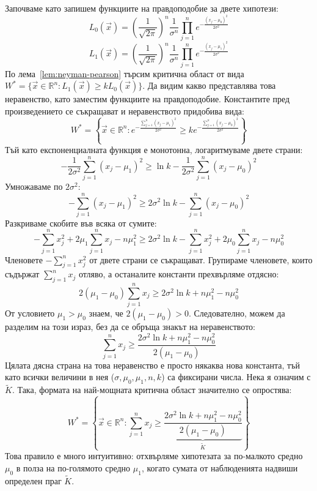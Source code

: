 \begin{example}
Започваме като запишем функциите на правдоподобие за двете хипотези:
\[
L_0(\vec{x}) = \left(\frac{1}{\sqrt{2\pi}}\right)^n \frac{1}{\sigma^n} \prod_{j=1}^n e^{-\frac{(x_j - \mu_0)^2}{2\sigma^2}}
\]
\[
L_1(\vec{x}) = \left(\frac{1}{\sqrt{2\pi}}\right)^n \frac{1}{\sigma^n} \prod_{j=1}^n e^{-\frac{(x_j - \mu_1)^2}{2\sigma^2}}
\]
По лема~\ref{lem:neyman-pearson} търсим критична област от вида $W^* = \{ \vec{x} \in \mathbb{R}^n : L_1(\vec{x}) \ge k L_0(\vec{x}) \}$. Да видим какво представлява това неравенство, като заместим функциите на правдоподобие. Константите пред произведението се съкращават и неравенството придобива вида:
\[
W^* = \left\{ \vec{x} \in \mathbb{R}^n : e^{-\frac{\sum_{j=1}^n (x_j - \mu_1)^2}{2\sigma^2}} \ge k e^{-\frac{\sum_{j=1}^n (x_j - \mu_0)^2}{2\sigma^2}} \right\}
\]
Тъй като експоненциалната функция е монотонна, логаритмуваме двете страни:
\[
-\frac{1}{2\sigma^2} \sum_{j=1}^n (x_j - \mu_1)^2 \ge \ln k - \frac{1}{2\sigma^2} \sum_{j=1}^n (x_j - \mu_0)^2
\]
Умножаваме по $2\sigma^2$:
\[
- \sum_{j=1}^n (x_j - \mu_1)^2 \ge 2\sigma^2 \ln k - \sum_{j=1}^n (x_j - \mu_0)^2
\]
Разкриваме скобите във всяка от сумите:
\[
- \sum_{j=1}^n x_j^2 + 2\mu_1 \sum_{j=1}^n x_j - n\mu_1^2 \ge 2\sigma^2 \ln k - \sum_{j=1}^n x_j^2 + 2\mu_0 \sum_{j=1}^n x_j - n\mu_0^2
\]
Членовете $-\sum_{j=1}^n x_j^2$ от двете страни се съкращават. Групираме членовете, които съдържат $\sum_{j=1}^n x_j$ отляво, а останалите константи прехвърляме отдясно:
\[
2(\mu_1 - \mu_0) \sum_{j=1}^n x_j \ge 2\sigma^2 \ln k + n\mu_1^2 - n\mu_0^2
\]
От условието $\mu_1 > \mu_0$ знаем, че $2(\mu_1 - \mu_0) > 0$. Следователно, можем да разделим на този израз, без да се обръща знакът на неравенството:
\[
\sum_{j=1}^n x_j \ge \frac{2\sigma^2 \ln k + n\mu_1^2 - n\mu_0^2}{2(\mu_1 - \mu_0)}
\]
Цялата дясна страна на това неравенство е просто някаква нова константа, тъй като всички величини в нея ($\sigma, \mu_0, \mu_1, n, k$) са фиксирани числа. Нека я означим с $\tilde{K}$.
Така, формата на най-мощната критична област значително се опростява:
\[
W^* = \left\{ \vec{x} \in \mathbb{R}^n : \sum_{j=1}^n x_j \ge \underbrace{\frac{2\sigma^2 \ln k + n\mu_1^2 - n\mu_0^2}{2(\mu_1 - \mu_0)}}_{\tilde{K}} \right\}
\]
Това правило е много интуитивно: отхвърляме хипотезата за по-малкото средно $\mu_0$ в полза на по-голямото средно $\mu_1$, когато сумата от наблюденията надвиши определен праг $\tilde{K}$.


\end{example}

